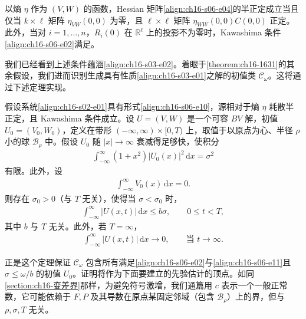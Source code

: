 \documentclass[../../main.tex]{subfiles}
\begin{document}
以熵 $\eta$ 作为 $(V,W)$ 的函数，Hessian 矩阵\eqref{align:ch16-s06-e04}的半正定成立当且仅当 $k\times\ell$ 矩阵 $\eta_{VW}(0,0)$ 为零，且 $\ell\times\ell$ 矩阵 $\eta_{WW}(0,0)C(0,0)$ 正定。此外，当对 $i=1,\ldots,n$，$R_i(0)$ 在 $\mathbb{R}^\ell$ 上的投影不为零时，Kawashima 条件\eqref{align:ch16-s06-e02}满足。

我们已经看到上述条件蕴涵\eqref{align:ch16-s03-e02}。着眼于\cref{theorem:ch16-1631}的其余假设，我们进而识别生成具有性质\eqref{align:ch16-s03-e01}之解的初值类 $\mathscr{C}_\omega$。这将通过下述定理实现。

\begin{theorem}\label{theorem:ch16-1661}
假设系统\eqref{align:ch16-s02-e01}具有形式\eqref{align:ch16-s06-e10}，源相对于熵 $\eta$ 耗散半正定，且 Kawashima 条件成立。设 $U=(V,W)$ 是一个可容 $BV$ 解，初值 $U_0=(V_0,W_0)$，定义在带形 $(-\infty,\infty)\times[0,T)$ 上，取值于以原点为心、半径 $\rho$ 小的球 $\mathscr{B}_\rho$ 中。假设 $U_0$ 随 $|x|\to\infty$ 衰减得足够快，使积分
\begin{align}
\int_{-\infty}^{\infty}(1+x^2)|U_0(x)|^2\,\mathrm{d}x=\sigma^2
\label{align:ch16-s06-e11}
\end{align}
有限。此外，设
\begin{align}
\int_{-\infty}^{\infty}V_0(x)\,\mathrm{d}x=0.
\label{align:ch16-s06-e12}
\end{align}
则存在 $\sigma_0>0$（与 $T$ 无关），使得当 $\sigma<\sigma_0$ 时，
\begin{align}
\int_{-\infty}^{\infty}|U(x,t)|\,\mathrm{d}x\leqslant b\sigma,\qquad 0\leqslant t<T,
\label{align:ch16-s06-e13}
\end{align}
其中 $b$ 与 $T$ 无关。此外，若 $T=\infty$，
\begin{align}
\int_{-\infty}^{\infty}|U(x,t)|\,\mathrm{d}x\to0,\qquad\text{当 }t\to\infty.
\label{align:ch16-s06-e14}
\end{align}
\end{theorem}

正是这个定理保证 $\mathscr{C}_\omega$ 包含所有满足\eqref{align:ch16-s06-e02}与\eqref{align:ch16-s06-e11}且 $\sigma\leqslant\omega/b$ 的初值 $U_0$。证明将作为下面要建立的先验估计的顶点。如同\cref{section:ch16-变差界}那样，为避免符号激增，我们通篇用 $c$ 表示一个一般正常数，它可能依赖于 $F,P$ 及其导数在原点某固定邻域（包含 $\mathscr{B}_\rho$）上的界，但与 $\rho,\sigma,T$ 无关。
\end{document}
